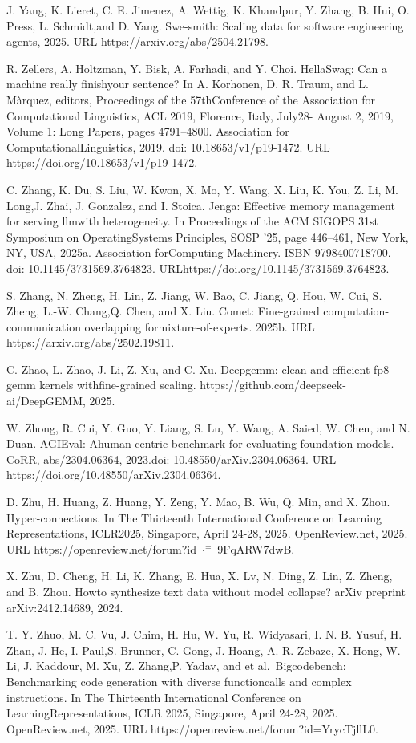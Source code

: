 \documentclass[
  10
]{article}
\begin{document}
J. Yang, K. Lieret, C. E. Jimenez, A. Wettig, K. Khandpur, Y. Zhang, B.
Hui, O. Press, L. Schmidt,and D. Yang. Swe-smith: Scaling data for
software engineering agents, 2025. URL https://arxiv.org/abs/2504.21798.

R. Zellers, A. Holtzman, Y. Bisk, A. Farhadi, and Y. Choi. HellaSwag:
Can a machine really finishyour sentence? In A. Korhonen, D. R. Traum,
and L. Màrquez, editors, Proceedings of the 57thConference of the
Association for Computational Linguistics, ACL 2019, Florence, Italy,
July28- August 2, 2019, Volume 1: Long Papers, pages 4791--4800.
Association for ComputationalLinguistics, 2019. doi:
10.18653/v1/p19-1472. URL https://doi.org/10.18653/v1/p19-1472.

C. Zhang, K. Du, S. Liu, W. Kwon, X. Mo, Y. Wang, X. Liu, K. You, Z. Li,
M. Long,J. Zhai, J. Gonzalez, and I. Stoica. Jenga: Effective memory
management for serving llmwith heterogeneity. In Proceedings of the ACM
SIGOPS 31st Symposium on OperatingSystems Principles, SOSP '25, page
446--461, New York, NY, USA, 2025a. Association forComputing Machinery.
ISBN 9798400718700. doi: 10.1145/3731569.3764823.
URLhttps://doi.org/10.1145/3731569.3764823.

S. Zhang, N. Zheng, H. Lin, Z. Jiang, W. Bao, C. Jiang, Q. Hou, W. Cui,
S. Zheng, L.-W. Chang,Q. Chen, and X. Liu. Comet: Fine-grained
computation-communication overlapping formixture-of-experts. 2025b. URL
https://arxiv.org/abs/2502.19811.

C. Zhao, L. Zhao, J. Li, Z. Xu, and C. Xu. Deepgemm: clean and efficient
fp8 gemm kernels withfine-grained scaling.
https://github.com/deepseek-ai/DeepGEMM, 2025.

W. Zhong, R. Cui, Y. Guo, Y. Liang, S. Lu, Y. Wang, A. Saied, W. Chen,
and N. Duan. AGIEval: Ahuman-centric benchmark for evaluating foundation
models. CoRR, abs/2304.06364, 2023.doi: 10.48550/arXiv.2304.06364. URL
https://doi.org/10.48550/arXiv.2304.06364.

D. Zhu, H. Huang, Z. Huang, Y. Zeng, Y. Mao, B. Wu, Q. Min, and X. Zhou.
Hyper-connections. In The Thirteenth International Conference on
Learning Representations, ICLR2025, Singapore, April 24-28, 2025.
OpenReview.net, 2025. URL https://openreview.net/forum?id
\(\cdot ^ { = }\) 9FqARW7dwB.

X. Zhu, D. Cheng, H. Li, K. Zhang, E. Hua, X. Lv, N. Ding, Z. Lin, Z.
Zheng, and B. Zhou. Howto synthesize text data without model collapse?
arXiv preprint arXiv:2412.14689, 2024.

T. Y. Zhuo, M. C. Vu, J. Chim, H. Hu, W. Yu, R. Widyasari, I. N. B.
Yusuf, H. Zhan, J. He, I. Paul,S. Brunner, C. Gong, J. Hoang, A. R.
Zebaze, X. Hong, W. Li, J. Kaddour, M. Xu, Z. Zhang,P. Yadav, and et
al.~Bigcodebench: Benchmarking code generation with diverse
functioncalls and complex instructions. In The Thirteenth International
Conference on LearningRepresentations, ICLR 2025, Singapore, April
24-28, 2025. OpenReview.net, 2025. URL
https://openreview.net/forum?id=YrycTjllL0.

\appendix


\end{document}
